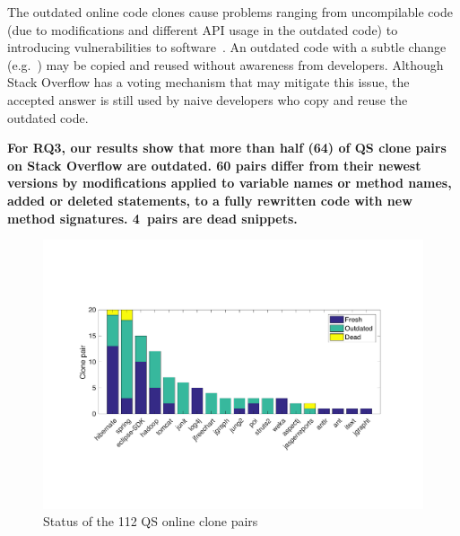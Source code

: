 \documentclass[sigconf,review, anonymous]{acmart}
\begin{document}
The outdated online code clones cause problems ranging from
uncompilable code (due to modifications and different API usage in the
outdated code) to introducing vulnerabilities to
software~\cite{Xia2014}. An outdated code with a subtle change
(e.g.~) may be copied and reused without
awareness from developers. Although Stack Overflow has a voting
mechanism that may mitigate this issue, the accepted answer is still
used by naive developers who copy and reuse the outdated code.

\textbf{For RQ3, our results show that more than half (64) of QS clone
  pairs on Stack Overflow are outdated. 60 pairs differ from their
  newest versions by modifications applied to variable names or method
  names, added or deleted statements, to a fully rewritten code with
  new method signatures. 4~pairs are dead
  snippets.} 


\begin{figure}
	\centering
	\includegraphics[width=\linewidth]{freshness}\vspace{-1ex}
	\caption{Status of the 112 QS online clone pairs}
	\label{fig:outdated}
\end{figure}
\end{document}
